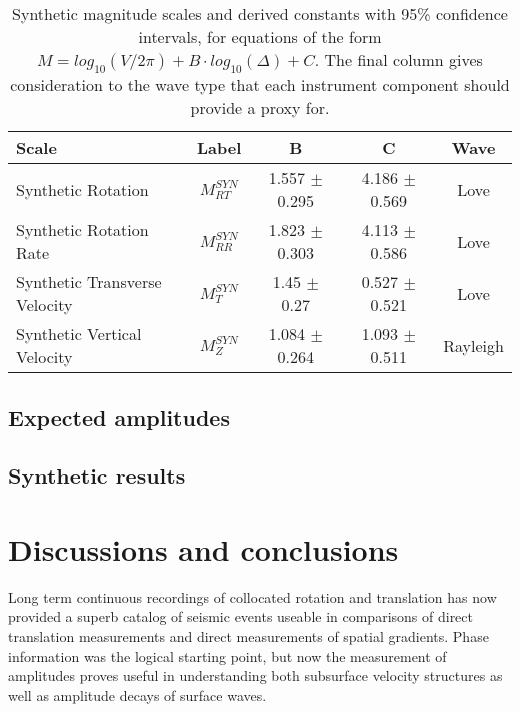 \documentclass{gji}
\begin{document}
\begin{table*}
\begin{minipage}{115mm}
	\begin{center}
		\begin{tabular}{ |l|c|c|c|c| } 
		        \bf{Scale} & \bf{Label} & \bf{B} & \bf{C}  & \bf{Wave}\\ \hline
        Synthetic Rotation  & $M^{SYN}_{RT}$ & 1.557 $\pm$ 0.295 & 4.186 $\pm$ 0.569  & Love \\ \hline
	Synthetic Rotation Rate & $M^{SYN}_{RR}$ & 1.823 $\pm$ 0.303 & 4.113 $\pm$ 0.586  & Love\\ \hline 
        Synthetic Transverse Velocity & $M^{SYN}_T$ & 1.45 $\pm$ 0.27 & 0.527 $\pm$ 0.521 & Love \\ \hline
        Synthetic Vertical Velocity  & $M^{SYN}_Z$ & 1.084 $\pm$ 0.264 & 1.093 $\pm$ 0.511  & Rayleigh \\ \hline
		\end{tabular}
		
    		\caption{Synthetic magnitude scales and derived constants with 95\% confidence intervals, for equations of the form $M = log_{10}(V/2\pi) + B\cdot log_{10}(\Delta) + C$. The final column gives consideration to the wave type that each instrument component should provide a proxy for.}
		\label{tab:scales}
	\end{center}
	\end{minipage}
\end{table*}

\subsection{Expected amplitudes}


\subsection{Synthetic results}

\section{Discussions and conclusions}
Long term continuous recordings of collocated rotation and translation has now provided a superb catalog of seismic events useable in comparisons of direct translation measurements and direct measurements of spatial gradients. Phase information was the logical starting point, but now the measurement of amplitudes proves useful in understanding both subsurface velocity structures as well as amplitude decays of surface waves. 
\end{document}
